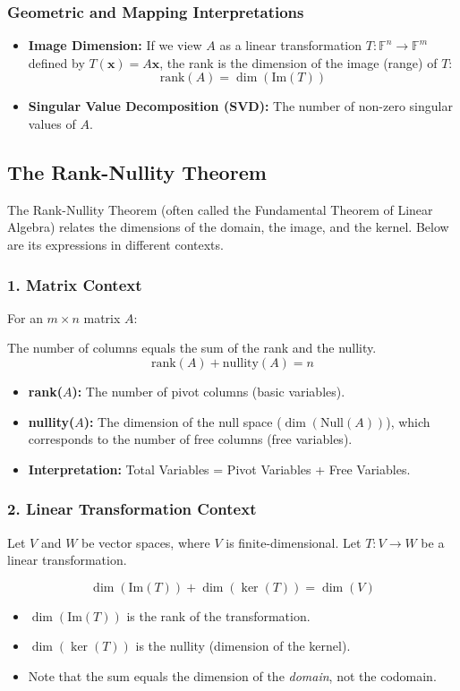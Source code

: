\subsubsection{Geometric and Mapping Interpretations}
\begin{itemize}
    \item \textbf{Image Dimension:} If we view $A$ as a linear transformation $T: \mathbb{F}^n \to \mathbb{F}^m$ defined by $T(\mathbf{x}) = A\mathbf{x}$, the rank is the dimension of the image (range) of $T$:
    \[ \text{rank}(A) = \dim(\text{Im}(T)) \]
    \item \textbf{Singular Value Decomposition (SVD):} The number of non-zero singular values of $A$.
\end{itemize}

\subsection{The Rank-Nullity Theorem}

The Rank-Nullity Theorem (often called the Fundamental Theorem of Linear Algebra) relates the dimensions of the domain, the image, and the kernel. Below are its expressions in different contexts.

\subsubsection{1. Matrix Context}
For an $m \times n$ matrix $A$:
\begin{theorem}
The number of columns equals the sum of the rank and the nullity.
\[ \text{rank}(A) + \text{nullity}(A) = n \]
\end{theorem}
\begin{itemize}
    \item \textbf{rank($A$):} The number of pivot columns (basic variables).
    \item \textbf{nullity($A$):} The dimension of the null space ($\dim(\text{Null}(A))$), which corresponds to the number of free columns (free variables).
    \item \textbf{Interpretation:} Total Variables = Pivot Variables + Free Variables.
\end{itemize}

\subsubsection{2. Linear Transformation Context}
Let $V$ and $W$ be vector spaces, where $V$ is finite-dimensional. Let $T: V \to W$ be a linear transformation.
\begin{theorem}
\[ \dim(\text{Im}(T)) + \dim(\ker(T)) = \dim(V) \]
\end{theorem}
\begin{itemize}
    \item $\dim(\text{Im}(T))$ is the rank of the transformation.
    \item $\dim(\ker(T))$ is the nullity (dimension of the kernel).
    \item Note that the sum equals the dimension of the \textit{domain}, not the codomain.
\end{itemize}

